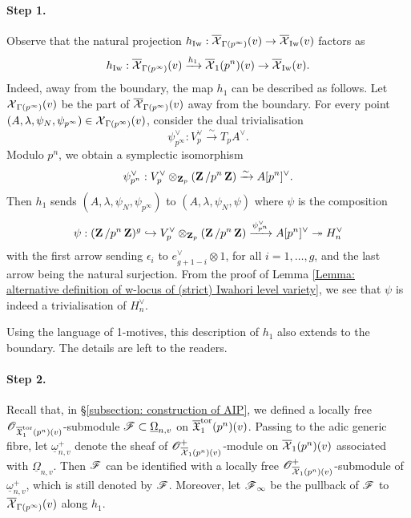 \paragraph{Step 1.} Observe that the natural projection $h_{\operatorname{Iw}}:\overline{\operatorname{\mathcal{X}}}_{\Gamma(p^{\infty})}(v) \rightarrow \overline{\operatorname{\mathcal{X}}}_{\operatorname{Iw}}(v)$ factors as \[
    h_{\operatorname{Iw}}: \overline{\operatorname{\mathcal{X}}}_{\Gamma(p^{\infty})}(v) \xrightarrow{h_1} \overline{\operatorname{\mathcal{X}}}_1(p^n)(v) \rightarrow \overline{\operatorname{\mathcal{X}}}_{\operatorname{Iw}}(v).
\] Indeed, away from the boundary, the map $h_1$ can be described as follows. Let $\operatorname{\mathcal{X}}_{\Gamma(p^{\infty})}(v)$ be the part of $\overline{\operatorname{\mathcal{X}}}_{\Gamma(p^{\infty})}(v)$ away from the boundary. For every point $(A, \lambda, \psi_N, \psi_{p^{\infty}})\in \operatorname{\mathcal{X}}_{\Gamma(p^{\infty})}(v)$, consider the dual trivialisation $$\psi_{p^{\infty}}^{\vee}: V^{\vee}_p\xrightarrow[]{\sim} T_pA^{\vee}.$$
Modulo $p^n$, we obtain a symplectic isomorphism $$\psi_{p^n}^{\vee}:V_p^{\vee}\otimes_{\operatorname{\mathbf{Z}}_p}(\operatorname{\mathbf{Z}}/p^n\operatorname{\mathbf{Z}})\xrightarrow[]{\sim} A[p^n]^{\vee}.$$
Then $h_1$ sends $(A, \lambda, \psi_N, \psi_{p^{\infty}})$ to $(A, \lambda, \psi_N, \psi)$ where $\psi$ is the composition $$\psi:(\operatorname{\mathbf{Z}}/p^n\operatorname{\mathbf{Z}})^g\hookrightarrow V_p^{\vee}\otimes_{\operatorname{\mathbf{Z}}_p}(\operatorname{\mathbf{Z}}/p^n\operatorname{\mathbf{Z}})\xrightarrow[]{\psi_{p^n}^{\vee}} A[p^n]^{\vee}\twoheadrightarrow H_n^{\vee}$$ with the first arrow sending $\epsilon_i$ to $e^{\vee}_{g+1-i}\otimes 1$, for all $i=1,\ldots, g$, and the last arrow being the natural surjection. From the proof of Lemma \ref{Lemma: alternative definition of w-locus of (strict) Iwahori level variety}, we see that $\psi$ is indeed a trivialisation of $H_n^{\vee}$.

Using the language of 1-motives, this description of $h_1$ also extends to the boundary. The details are left to the readers.

\paragraph{Step 2.} Recall that, in \S \ref{subsection: construction of AIP}, we defined a locally free $\operatorname{\mathscr{O}}_{\overline{\operatorname{\mathfrak{X}}}^{\operatorname{tor}}_1(p^n)(v)}$-submodule $\operatorname{\mathscr{F}}\subset \underline{\Omega}_{n, v}$ on $\overline{\operatorname{\mathfrak{X}}}^{\operatorname{tor}}_{1}(p^n)(v)$. Passing to the adic generic fibre, let $\underline{\omega}_{n, v}^+$ denote the sheaf of $\operatorname{\mathscr{O}}^+_{\overline{\operatorname{\mathcal{X}}}_{1}(p^n)(v)}$-module on $\overline{\operatorname{\mathcal{X}}}_{1}(p^n)(v)$ associated with $\underline{\Omega}_{n, v}$. Then $\operatorname{\mathscr{F}}$ can be identified with a locally free $\operatorname{\mathscr{O}}_{\overline{\operatorname{\mathcal{X}}}_{1}(p^n)(v)}^+$-submodule of $\underline{\omega}_{n, v}^+$, which is still denoted by $\operatorname{\mathscr{F}}$. Moreover, let $\operatorname{\mathscr{F}}_{\infty}$ be the pullback of $\operatorname{\mathscr{F}}$ to $\overline{\operatorname{\mathcal{X}}}_{\Gamma(p^{\infty})}(v)$ along $h_1$.


